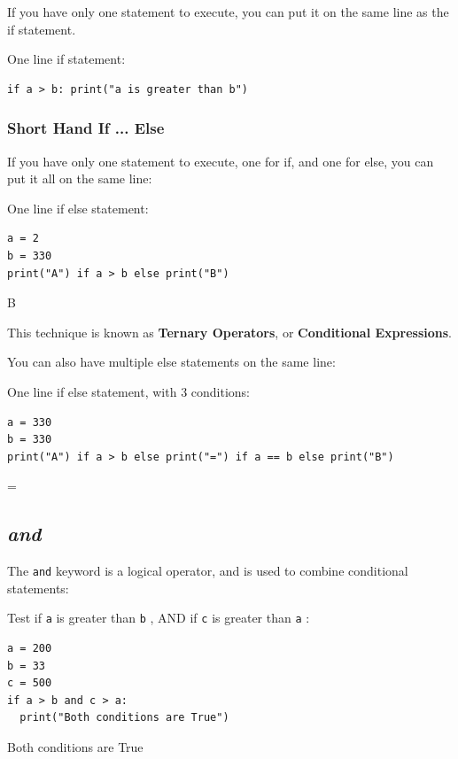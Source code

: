 \documentclass[12pt,a4paper]{article}
\newcommand{\code}[1]{%
	\colorbox{backcolour}{\lstinline{#1}}%
}
\newcommand{\lcode}[1]{%
	\lstinline{#1}%
}
\begin{document}
If you have only one statement to execute, you can put it on the same line as
the if statement.

\begin{ebox}
One line if statement:
	\begin{lstlisting}
if a > b: print("a is greater than b")
	\end{lstlisting}
\end{ebox}

\subsubsection{Short Hand If ... Else}

If you have only one statement to execute, one for if, and one for else, you
can put it all on the same line:

\begin{ebox}
One line if else statement:
	\begin{lstlisting}
a = 2
b = 330
print("A") if a > b else print("B")
	\end{lstlisting}
\tcblower
	\begin{vercode}
B
	\end{vercode}
\end{ebox}

\begin{nbox}
This technique is known as \textbf{Ternary Operators}, or
\textbf{Conditional Expressions}.
\end{nbox}

You can also have multiple else statements on the same line:

\begin{ebox}
One line if else statement, with 3 conditions:
	\begin{lstlisting}
a = 330
b = 330
print("A") if a > b else print("=") if a == b else print("B")
	\end{lstlisting}
\tcblower
	\begin{vercode}
=
	\end{vercode}
\end{ebox}
\subsection{\textit{and}}

The \code{and} keyword is a logical operator, and is used to combine
conditional statements:

\begin{ebox}
Test if \lcode{a} is greater than \lcode{b}, AND if \lcode{c} is greater than
\lcode{a}:
	\begin{lstlisting}
a = 200
b = 33
c = 500
if a > b and c > a:
  print("Both conditions are True")
	\end{lstlisting}
\tcblower
	\begin{vercode}
Both conditions are True
	\end{vercode}
\end{ebox}
\end{document}
